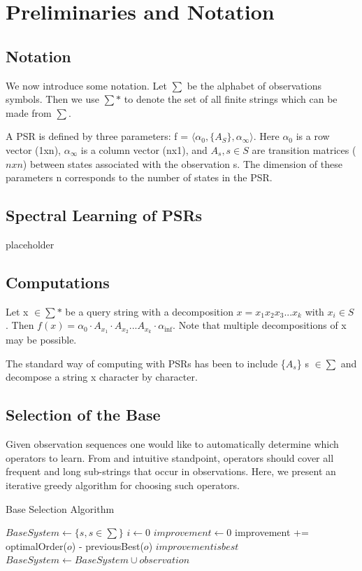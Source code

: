 \documentclass{acm_proc_article-sp}
\begin{document}
\section{Preliminaries and Notation}

\subsection{Notation}
We now introduce some notation. Let $\sum$ be the alphabet of observations symbols. Then we use $\sum*$ to denote the set of all finite strings which can be made from $\sum$.

A PSR is defined by three parameters: f = $\langle\alpha_0, \{A_S\},\alpha_{\infty}\rangle$. Here $\alpha_0$ is a row vector (1xn), $\alpha_{\infty}$ is a column vector (nx1), and $A_s, s \in S$ are transition matrices ($nxn$) between states associated with the observation s. The dimension of these parameters n corresponds to the number of states in the PSR. 

\subsection{Spectral Learning of PSRs}
placeholder

\subsection{Computations}
Let x $\in \sum*$ be a query string with a decomposition $x=x_1x_2x_3...x_k$ with $x_i \in S$ . Then  $f(x) = \alpha_0 \cdot A_{x_1} \cdot A_{x_2} ... A_{x_k} \cdot \alpha_{\inf}$. Note that multiple decompositions of x may be possible. 

The standard way of computing with PSRs has been to include \{$A_s$\} s $\in \sum$ and decompose a string x character by character.

\subsection{Selection of the Base}

Given observation sequences one would like to automatically determine which operators to learn. From and intuitive standpoint, operators should cover all frequent and long sub-strings that occur in observations. Here, we present an iterative greedy algorithm for choosing such operators.

\begin{algorithm}
\caption{Base Selection Algorithm}
\label{Base Selection}
\begin{algorithmic}[1]
\State $BaseSystem \gets \{s, s \in \sum \}$
\State $i\gets 0$
\State $improvement \gets 0$
	improvement += optimalOrder($o$) - previousBest($o$)
\EndFor
\If $improvement is best$ \then
\State $BaseSystem \gets BaseSystem \cup observation$
\EndIf
\EndFor
\EndWhile
\EndProcedure
\end{algorithmic}
\end{algorithm}
\end{document}
